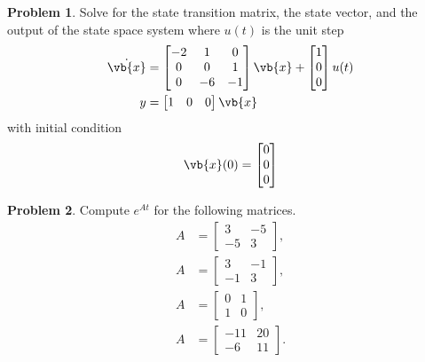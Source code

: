 \documentclass[10pt]{article}
\theoremstyle{definition}
\newtheorem{prob}{Problem}[section]
\begin{document}
\begin{prob}
    Solve for the state transition matrix, the state vector, and the output of the state space system where \( u(t) \) is the unit step
    \begin{align*}
        \dot{\vb{x}} &= \begin{bmatrix}-2 & 1 & 0 \\ 0 & 0 & 1 \\ 0 & -6 & -1\end{bmatrix} \vb{x} + \begin{bmatrix}1 \\ 0 \\ 0\end{bmatrix} u(t)  \\
        y &= \begin{bmatrix}1 & 0 & 0\end{bmatrix} \vb{x} 
    \end{align*}
    with initial condition
    \begin{align*}
        \vb{x}(0) = \begin{bmatrix}0 \\ 0 \\ 0\end{bmatrix}
    \end{align*}
\end{prob}

\begin{prob}
    Compute \( e^{A t}\) for the following matrices.
    \begin{align*}
        A &= \begin{bmatrix} 3 & -5 \\ -5 & 3 \end{bmatrix} , \\
        A &= \begin{bmatrix} 3 & -1 \\ -1 & 3 \end{bmatrix} , \\
        A &= \begin{bmatrix} 0 & 1 \\ 1 & 0 \end{bmatrix} ,  \\
        A &= \begin{bmatrix} -11 & 20 \\ -6 & 11 \end{bmatrix}. 
    \end{align*}
\end{prob}
\end{document}
